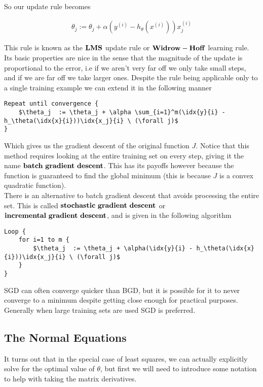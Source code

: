 \documentclass[11pt]{exam}
\newcommand{\idx}[2]{#1^{(#2)}}
\begin{document}
So our update rule becomes

\begin{align*}
\theta_j  := \theta_j + \alpha(\idx{y}{i} - h_\theta(\idx{x}{i}))\idx{x_j}{i}
\end{align*}

This rule is known as the $\bf{LMS}$ update rule or $\bf{Widrow-Hoff}$ learning rule. Its basic properties are nice in the sense that the magnitude of the update is proportional to the error, i.e if we aren't very far off we only take small steps, and if we are far off we take larger ones. Despite the rule being applicable only to a single training example we can extend it in the following manner

\begin{lstlisting}[mathescape=true] 
Repeat until convergence {
	$\theta_j  := \theta_j + \alpha \sum_{i=1}^m(\idx{y}{i} - h_\theta(\idx{x}{i}))\idx{x_j}{i} \ (\forall j)$
}
\end{lstlisting}

Which gives us the gradient descent of the original function $J$. Notice that this method requires looking at the entire training set on every step, giving it the name $\bf{batch \ gradient \ descent}$. This has its payoffs however because the function is guaranteed to find the global minimum (this is because $J$ is a convex quadratic function).\\

There is an alternative to batch gradient descent that avoids processing the entire set. This is called $\bf{stochastic \ gradient \ descent}$ or $\bf{incremental \ gradient \ descent}$, and is given in the following algorithm

\begin{lstlisting}[mathescape=true] 
Loop {
	for i=1 to m {
		$\theta_j  := \theta_j + \alpha(\idx{y}{i} - h_\theta(\idx{x}{i}))\idx{x_j}{i} \ (\forall j)$
	}
}
\end{lstlisting}

SGD can often converge quicker than BGD, but it is possible for it to never converge to a minimum despite getting close enough for practical purposes. Generally when large training sets are used SGD is preferred.


\subsection{The Normal Equations}

It turns out that in the special case of least squares, we can actually explicitly solve for the optimal value of $\theta$, but first we will need to introduce some notation to help with taking the matrix derivatives.
\end{document}
